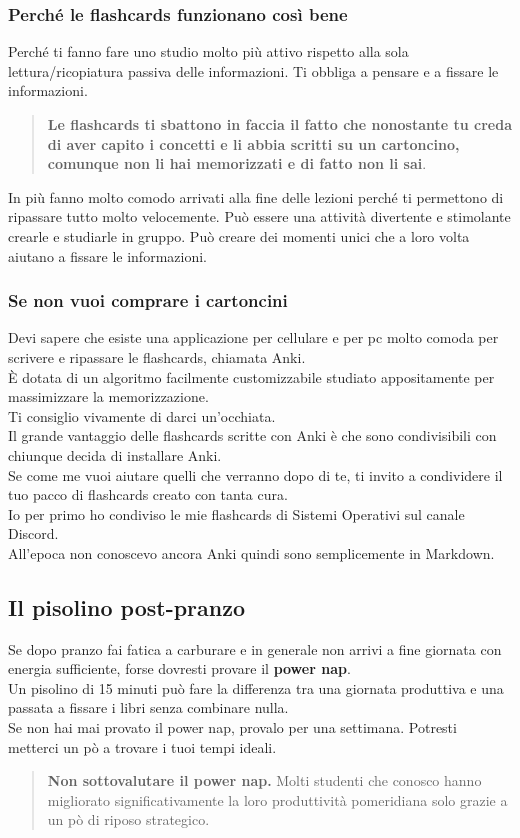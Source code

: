 \documentclass{article}
\begin{document}
\subsubsection{Perché le flashcards funzionano così bene}
Perché ti fanno fare uno studio molto più attivo rispetto alla sola lettura/ricopiatura passiva delle informazioni.  
Ti obbliga a pensare e a fissare le informazioni.
\begin{quote}
\textbf{Le flashcards ti sbattono in faccia il fatto che nonostante tu creda di aver capito i concetti e li abbia scritti su un cartoncino, comunque non li hai memorizzati e di fatto non li sai}. 
\end{quote}
In più fanno molto comodo arrivati alla fine delle lezioni perché ti permettono di ripassare tutto molto velocemente.  
Può essere una attività divertente e stimolante crearle e studiarle in gruppo.  
Può creare dei momenti unici che a loro volta aiutano a fissare le informazioni. 


\subsubsection{Se non vuoi comprare i cartoncini}
Devi sapere che esiste una applicazione per cellulare e per pc molto comoda per scrivere e ripassare le flashcards, chiamata Anki.\\
È dotata di un algoritmo facilmente customizzabile studiato appositamente per massimizzare la memorizzazione.\\
Ti consiglio vivamente di darci un'occhiata.\\
Il grande vantaggio delle flashcards scritte con Anki è che sono condivisibili con chiunque decida di installare Anki.\\
Se come me vuoi aiutare quelli che verranno dopo di te, ti invito a condividere il tuo pacco di flashcards creato con tanta cura.\\
Io per primo ho condiviso le mie flashcards di Sistemi Operativi sul canale Discord.\\
All'epoca non conoscevo ancora Anki quindi sono semplicemente in Markdown.\\


\subsection{Il pisolino post-pranzo}
Se dopo pranzo fai fatica a carburare e in generale non arrivi a fine giornata con energia sufficiente, forse dovresti provare il \textbf{power nap}.\\
Un pisolino di 15 minuti può fare la differenza tra una giornata produttiva e una passata a fissare i libri senza combinare nulla.\\
Se non hai mai provato il power nap, provalo per una settimana. Potresti metterci un pò a trovare i tuoi tempi ideali.
\begin{quote}
\textbf{Non sottovalutare il power nap.} Molti studenti che conosco hanno migliorato significativamente la loro produttività pomeridiana solo grazie a un pò di riposo strategico.
\end{quote}
\end{document}
